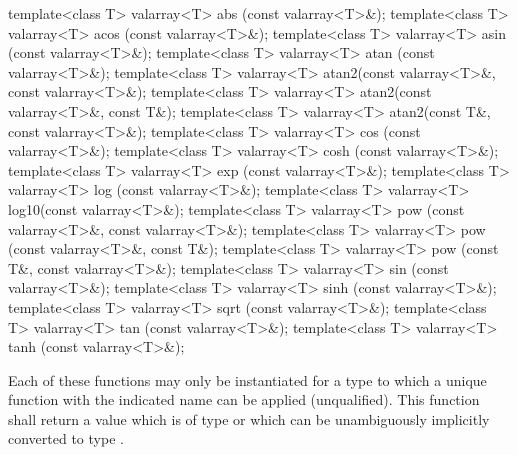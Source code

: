 %
%
%
%
%
%
%
%
%
%
%
%
%
%
%
%
\begin{itemdecl}
template<class T> valarray<T> abs  (const valarray<T>&);
template<class T> valarray<T> acos (const valarray<T>&);
template<class T> valarray<T> asin (const valarray<T>&);
template<class T> valarray<T> atan (const valarray<T>&);
template<class T> valarray<T> atan2(const valarray<T>&, const valarray<T>&);
template<class T> valarray<T> atan2(const valarray<T>&, const T&);
template<class T> valarray<T> atan2(const T&, const valarray<T>&);
template<class T> valarray<T> cos  (const valarray<T>&);
template<class T> valarray<T> cosh (const valarray<T>&);
template<class T> valarray<T> exp  (const valarray<T>&);
template<class T> valarray<T> log  (const valarray<T>&);
template<class T> valarray<T> log10(const valarray<T>&);
template<class T> valarray<T> pow  (const valarray<T>&, const valarray<T>&);
template<class T> valarray<T> pow  (const valarray<T>&, const T&);
template<class T> valarray<T> pow  (const T&, const valarray<T>&);
template<class T> valarray<T> sin  (const valarray<T>&);
template<class T> valarray<T> sinh (const valarray<T>&);
template<class T> valarray<T> sqrt (const valarray<T>&);
template<class T> valarray<T> tan  (const valarray<T>&);
template<class T> valarray<T> tanh (const valarray<T>&);
\end{itemdecl}

\begin{itemdescr}
\pnum
\requires
Each of these functions may only be instantiated for a type 
to which a unique function with the indicated name can be applied (unqualified).
This function shall return a value which is of type 
or which can be unambiguously implicitly converted to type .
\end{itemdescr}

